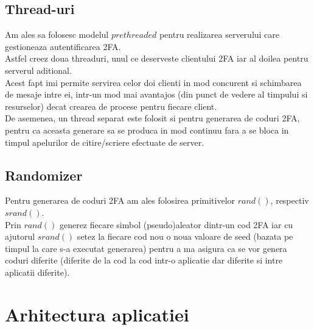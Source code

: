 \documentclass{article}
\begin{document}
	\subsection{Thread-uri}
	Am ales sa folosesc modelul $prethreaded$ pentru realizarea serverului care gestioneaza autentificarea 2FA. \\
	Astfel creez doua threaduri, unul ce deserveste clientului 2FA iar al doilea pentru serverul aditional. \\
	Acest fapt imi permite servirea celor doi clienti in mod concurent si schimbarea de mesaje intre ei, intr-un mod mai avantajos (din punct de vedere al timpului si resurselor) decat crearea de procese pentru fiecare client. \\
	De asemenea, un thread separat este folosit si pentru generarea de coduri 2FA, pentru ca aceasta generare sa se produca in mod continuu fara a se bloca in timpul apelurilor de citire/scriere efectuate de server.
	
	\subsection{Randomizer}
	Pentru generarea de coduri 2FA am ales folosirea primitivelor $rand()$, respectiv $srand()$. \\
	Prin $rand()$ generez fiecare simbol (pseudo)aleator dintr-un cod 2FA iar cu ajutorul $srand()$ setez la fiecare cod nou o noua valoare de seed (bazata pe timpul la care s-a executat generarea) pentru a ma asigura ca se vor genera coduri diferite (diferite de la cod la cod intr-o aplicatie dar diferite si intre aplicatii diferite).
	
	\section{Arhitectura aplicatiei}
	 
\end{document}
